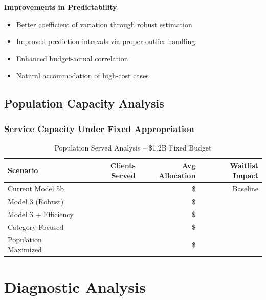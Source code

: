 \textbf{Improvements in Predictability}:
\begin{itemize}
    \item Better coefficient of variation through robust estimation
    \item Improved prediction intervals via proper outlier handling
    \item Enhanced budget-actual correlation
    \item Natural accommodation of high-cost cases
\end{itemize}

\subsection{Population Capacity Analysis}

\subsubsection{Service Capacity Under Fixed Appropriation}

\begin{table}[h]
\centering
\caption{Population Served Analysis -- \$1.2B Fixed Budget}
\begin{tabular}{lrrr}
\toprule
\textbf{Scenario} & \textbf{Clients Served} & \textbf{Avg Allocation} & \textbf{Waitlist Impact} \\
\midrule
Current Model 5b & \ModelThreePopcurrentbaselineClients{} & \$\ModelThreePopcurrentbaselineAvgAlloc{} & Baseline \\
Model 3 (Robust) & \ModelThreePopmodelbalancedClients{} & \$\ModelThreePopmodelbalancedAvgAlloc{} & \ModelThreePopmodelbalancedWaitlistChange{} \\
Model 3 + Efficiency & \ModelThreePopmodelefficiencyClients{} & \$\ModelThreePopmodelefficiencyAvgAlloc{} & \ModelThreePopmodelefficiencyWaitlistChange{} \\
Category-Focused & \ModelThreePopcategoryfocusedClients{} & \$\ModelThreePopcategoryfocusedAvgAlloc{} & \ModelThreePopcategoryfocusedWaitlistChange{} \\
Population Maximized & \ModelThreePoppopulationmaximizedClients{} & \$\ModelThreePoppopulationmaximizedAvgAlloc{} & \ModelThreePoppopulationmaximizedWaitlistChange{} \\
\bottomrule
\end{tabular}
\end{table}

\section{Diagnostic Analysis}

